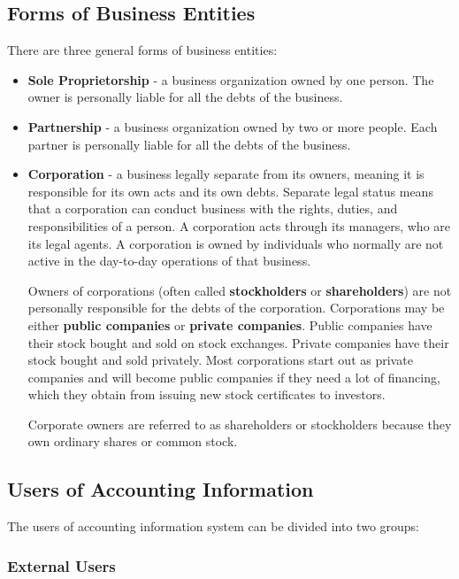 \documentclass[../main.tex]{subfiles}
\begin{document}
	
	\subsection{Forms of Business Entities}
	
	There are three general forms of business entities: 
	\begin{itemize}[noitemsep]
		\item \textbf{Sole Proprietorship} - a business organization owned by 
		one person. The owner is personally liable for all the debts of the 
		business.
		\item \textbf{Partnership} - a business organization owned by two or 
		more people. Each partner is personally liable for all the debts of the 
		business.
		\item \textbf{Corporation} - a business legally separate from its 
		owners, meaning it is responsible for its own acts and its own debts. 
		Separate legal status means that a corporation can conduct business 
		with the rights, duties, and responsibilities of a person. A 
		corporation acts through its managers, who are its legal agents. A 
		corporation is owned by individuals who normally are not active in the 
		day-to-day operations of that business.
		
		Owners of corporations (often called \textbf{stockholders} or 
		\textbf{shareholders}) are 
		not personally responsible for the debts of the corporation. 
		Corporations may be either \textbf{public companies} or \textbf{private 
		companies}. Public companies have their stock bought and sold on stock 
		exchanges. Private companies have their stock bought and sold 
		privately. Most corporations start out as private companies and will 
		become public companies if they need a lot of financing, which they 
		obtain from issuing new stock certificates to investors. 
		
		Corporate owners are referred to as shareholders or stockholders 
		because they own ordinary shares or common stock.
	\end{itemize}
	
	\subsection{Users of Accounting Information}
	
	The users of accounting information system can be divided into two groups:
	
	\subsubsection{External Users}
	
\end{document}
